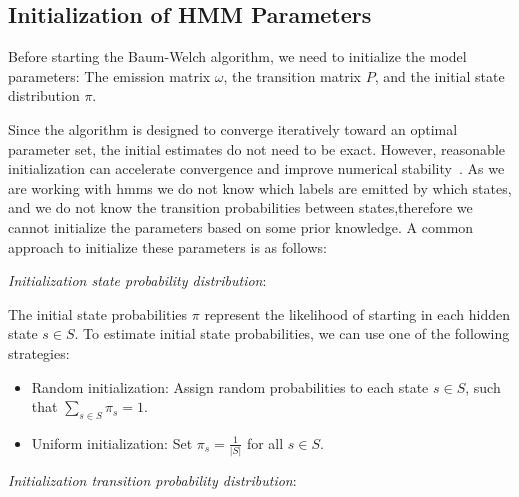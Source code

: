 \subsection{Initialization of HMM Parameters}\label{subsec:initialization}
Before starting the Baum-Welch algorithm, we need to initialize the model parameters: The emission matrix $\omega$, the transition matrix $P$, and the initial state distribution $\pi$.

Since the algorithm is designed to converge iteratively toward an optimal parameter set, the initial estimates do not need to be exact. 
However, reasonable initialization can accelerate convergence and improve numerical stability~\cite{benyacoub2015initial}. 
As we are working with \glspl{hmm} we do not know which labels are emitted by which states, and we do not know the transition probabilities between states,therefore we cannot initialize the parameters based on some prior knowledge.
A common approach to initialize these parameters is as follows:

\textit{Initialization state probability distribution}:

The initial state probabilities $\pi$ represent the likelihood of starting in each hidden state $s \in S$. 
To estimate initial state probabilities, we can use one of the following strategies:
\begin{itemize}
    \item Random initialization: Assign random probabilities to each state $s \in S$, such that $\sum_{s \in S} \pi_s = 1$.
    \item Uniform initialization: Set $\pi_s = \frac{1}{|S|}$ for all $s \in S$.
\end{itemize}

\textit{Initialization transition probability distribution}:

